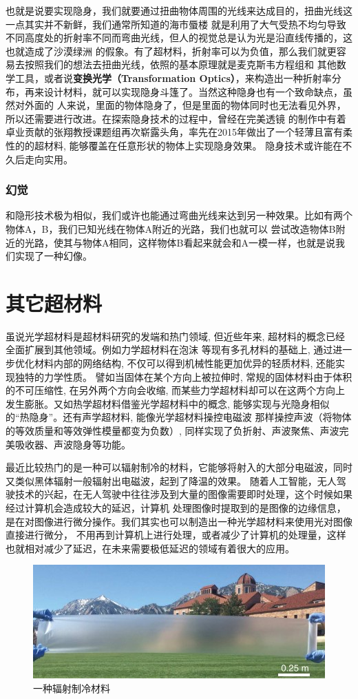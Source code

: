 \documentclass[UTF8]{ctexart}
\begin{document}
也就是说要实现隐身，我们就要通过扭曲物体周围的光线来达成目的，扭曲光线这一点其实并不新鲜，我们通常所知道的海市蜃楼
就是利用了大气受热不均匀导致不同高度处的折射率不同而弯曲光线，但人的视觉总是认为光是沿直线传播的，这也就造成了沙漠绿洲
的假象。有了超材料，折射率可以为负值，那么我们就更容易去按照我们的想法去扭曲光线，依照的基本原理就是麦克斯韦方程组和
其他数学工具，或者说\textbf{变换光学（Transformation Optics）}，来构造出一种折射率分布，再来设计材料，就可以实现隐身斗篷了。当然这种隐身也有一个致命缺点，虽然对外面的
人来说，里面的物体隐身了，但是里面的物体同时也无法看见外界，所以还需要进行改进。在探索隐身技术的过程中，曾经在完美透镜
的制作中有着卓业贡献的张翔教授课题组再次崭露头角，率先在2015年做出了一个轻薄且富有柔性的的超材料, 能够覆盖在任意形状的物体上实现隐身效果。
隐身技术或许能在不久后走向实用。

\subsubsection{幻觉}
和隐形技术极为相似，我们或许也能通过弯曲光线来达到另一种效果。比如有两个物体A，B，我们已知光线在物体A附近的光路，我们也就可以
尝试改造物体B附近的光路，使其与物体A相同，这样物体B看起来就会和A一模一样，也就是说我们实现了一种幻像。

\section{其它超材料}
虽说光学超材料是超材料研究的发端和热门领域, 但近些年来, 超材料的概念已经全面扩展到其他领域。例如力学超材料在泡沫
等现有多孔材料的基础上, 通过进一步优化材料内部的网络结构, 不仅可以得到机械性能更加优异的轻质材料, 还能实现独特的力学性质。
譬如当固体在某个方向上被拉伸时, 常规的固体材料由于体积的不可压缩性, 在另外两个方向会收缩, 而某些力学超材料却可以在这两个方向上
发生膨胀。又如热学超材料借鉴光学超材料中的概念, 能够实现与光隐身相似的“热隐身”。还有声学超材料, 能像光学超材料操控电磁波
那样操控声波（将物体的等效质量和等效弹性模量都变为负数）, 同样实现了负折射、声波聚焦、声波完美吸收器、声波隐身等功能。


最近比较热门的是一种可以辐射制冷的材料，它能够将射入的大部分电磁波，同时又类似黑体辐射一般辐射出电磁波，起到了降温的效果。
随着人工智能，无人驾驶技术的兴起，在无人驾驶中往往涉及到大量的图像需要即时处理，这个时候如果经过计算机会造成较大的延迟，计算机
处理图像时提取到的是图像的边缘信息，是在对图像进行微分操作。我们其实也可以制造出一种光学超材料来使用光对图像直接进行微分，
不用再到计算机上进行处理，或者减少了计算机的处理量，这样也就相对减少了延迟，在未来需要极低延迟的领域有着很大的应用。
\begin{figure}[htbp]
\centering
\includegraphics[width=\textwidth]{cooling.jpg}
\caption{一种辐射制冷材料\cite{RN14}}   
\end{figure}
\end{document}
